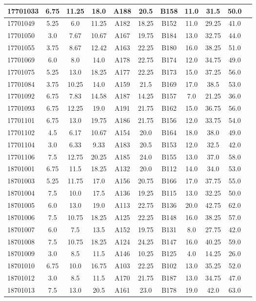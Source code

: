 \documentclass[12pt]{article}
\begin{document}
\begin{center}
\begin{small}
\begin{tabular}{|l|c|c|c|c|c|c|c|c|c|c|}
17701033 & 6.75 & 11.25 & 18.0 & A188 & 20.5 & B158 & 11.0 & 31.5 & 50.0\\ \hline 
17701049 & 5.25 & 6.0 & 11.25 & A182 & 18.25 & B152 & 11.0 & 29.25 & 41.0\\ \hline 
17701050 & 3.0 & 7.67 & 10.67 & A167 & 19.75 & B184 & 13.0 & 32.75 & 44.0\\ \hline 
17701055 & 3.75 & 8.67 & 12.42 & A163 & 22.25 & B180 & 16.0 & 38.25 & 51.0\\ \hline 
17701069 & 6.0 & 8.0 & 14.0 & A178 & 22.75 & B174 & 12.0 & 34.75 & 49.0\\ \hline 
17701075 & 5.25 & 13.0 & 18.25 & A177 & 22.25 & B173 & 15.0 & 37.25 & 56.0\\ \hline 
17701084 & 3.75 & 10.25 & 14.0 & A159 & 21.5 & B169 & 17.0 & 38.5 & 53.0\\ \hline 
17701092 & 6.75 & 7.83 & 14.58 & A187 & 14.25 & B157 & 7.0 & 21.25 & 36.0\\ \hline 
17701093 & 6.75 & 12.25 & 19.0 & A191 & 21.75 & B162 & 15.0 & 36.75 & 56.0\\ \hline 
17701101 & 6.75 & 13.0 & 19.75 & A186 & 21.75 & B156 & 12.0 & 33.75 & 54.0\\ \hline 
17701102 & 4.5 & 6.17 & 10.67 & A154 & 20.0 & B164 & 18.0 & 38.0 & 49.0\\ \hline 
17701104 & 3.0 & 6.33 & 9.33 & A183 & 20.5 & B153 & 12.0 & 32.5 & 42.0\\ \hline 
17701106 & 7.5 & 12.75 & 20.25 & A185 & 24.0 & B155 & 13.0 & 37.0 & 58.0\\ \hline 
18701001 & 6.75 & 11.5 & 18.25 & A132 & 20.0 & B112 & 14.0 & 34.0 & 53.0\\ \hline 
18701003 & 5.25 & 11.75 & 17.0 & A156 & 20.75 & B166 & 17.0 & 37.75 & 55.0\\ \hline 
18701004 & 7.5 & 10.0 & 17.5 & A136 & 19.25 & B115 & 13.0 & 32.25 & 50.0\\ \hline 
18701005 & 6.0 & 13.0 & 19.0 & A113 & 22.75 & B136 & 20.0 & 42.75 & 62.0\\ \hline 
18701006 & 7.5 & 10.75 & 18.25 & A125 & 22.25 & B148 & 16.0 & 38.25 & 57.0\\ \hline 
18701007 & 6.0 & 7.5 & 13.5 & A152 & 19.75 & B131 & 8.0 & 27.75 & 42.0\\ \hline 
18701008 & 7.5 & 10.75 & 18.25 & A124 & 24.25 & B147 & 16.0 & 40.25 & 59.0\\ \hline 
18701009 & 3.0 & 8.5 & 11.5 & A146 & 10.25 & B125 & 4.0 & 14.25 & 26.0\\ \hline 
18701010 & 6.75 & 10.0 & 16.75 & A103 & 22.25 & B102 & 13.0 & 35.25 & 52.0\\ \hline 
18701012 & 3.0 & 8.5 & 11.5 & A170 & 21.75 & B187 & 13.0 & 34.75 & 47.0\\ \hline 
18701013 & 7.5 & 13.0 & 20.5 & A161 & 23.0 & B178 & 19.0 & 42.0 & 63.0\\ \hline 
        \end{tabular}
            \end{small}
            \end{center}
  \centering
            
\end{document}
